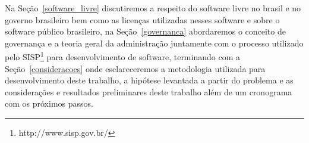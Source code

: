 Na Seção~\ref{software_livre} discutiremos a respeito do software livre no brasil e no governo 
brasileiro bem como as licenças utilizadas nesses software e sobre o software público 
brasileiro,
%
na Seção~\ref{governanca} abordaremos o conceito de governança e a teoria geral
da administração juntamente com o processo utilizado pelo SISP\footnote{http://www.sisp.gov.br/}
para desenvolvimento de software,
%
terminando com a Seção~\ref{consideracoes} onde esclareceremos a metodologia utilizada para desenvolvimento
deste trabalho, a hipótese levantada a partir do problema e as considerações e resultados preliminares 
deste trabalho além de um cronograma com os próximos passos. 



